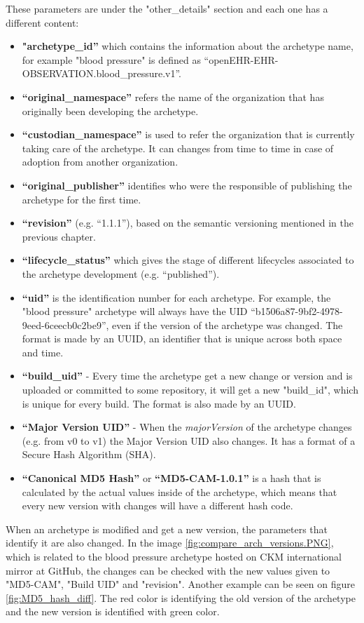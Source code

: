 \documentclass[mim_thesis.tex]{subfiles}
\begin{document}
These parameters are under the "other\_details" section and each one has a different content: 
\begin{itemize}[noitemsep]
\item \textbf{"archetype\_id”} which contains the information about the archetype name, for example "blood pressure" is defined as “openEHR-EHR-OBSERVATION.blood\_pressure.v1”. 
\item \textbf{“original\_namespace”} refers the name of the organization that has originally been developing the archetype. 
\item \textbf{“custodian\_namespace”} is used to refer the organization that is currently taking care of the archetype. It can changes from time to time in case of adoption from another organization. 
\item \textbf{“original\_publisher”} identifies who were the responsible of publishing the archetype for the first time.   
\item \textbf{“revision”} (e.g. “1.1.1”), based on the semantic versioning mentioned in the previous chapter. 
\item \textbf{“lifecycle\_status”} which gives the stage of different lifecycles associated to the archetype development (e.g. “published”).
\item \textbf{“uid”} is the identification number for each archetype. For example, the "blood pressure" archetype will always have the UID “b1506a87-9bf2-4978-9eed-6ceecb0c2be9”, even if the version of the archetype was changed. The format is made by an \ac{UUID}, an identifier that is unique across both space and time.
\item \textbf{“build\_uid”} -  Every time the archetype get a new change or version and is uploaded or committed to some repository, it will get a new "build\_id", which is unique for every build. The format is also made by an UUID. 
\item \textbf{“Major Version UID”} - When the \textit{majorVersion} of the archetype changes (e.g. from v0 to v1) the Major Version UID also changes. It has a format of a Secure Hash Algorithm (SHA).
\item \textbf{“Canonical MD5 Hash”} or \textbf{“MD5-CAM-1.0.1”} is a hash that is calculated by the actual values inside of the archetype, which means that every new version with changes will have a different hash code.
\end{itemize}

When an archetype is modified and get a new version, the parameters that identify it are also changed. In the image \ref{fig:compare_arch_versions.PNG}, which is related to the blood pressure archetype hosted on CKM international mirror at GitHub, the changes can be checked with the new values given to "MD5-CAM", "Build UID" and "revision". Another example can be seen on figure \ref{fig:MD5_hash_diff}. The red color is identifying the old version of the archetype and the new version is identified with green color.  
\end{document}

